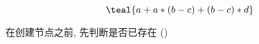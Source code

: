 
\begin{frame}{}
  \begin{center}

    \[
      \teal{a + a \ast (b - c) + (b - c) \ast d}
    \]
  \end{center}
\end{frame}

\begin{frame}{}
  \begin{center}

    \pause
    \vspace{0.50cm}
    在创建节点之前, 先判断是否已存在 ()
  \end{center}
\end{frame}
